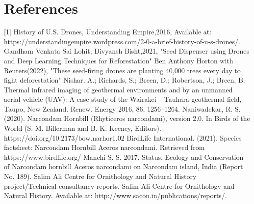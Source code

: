 \documentclass[pmlr,twocolumn,10pt]{jmlr}
\begin{document}
\section*{References}
[1] History of U.S. Drones, Understanding Empire,2016, Available at: https://understandingempire.wordpress.com/2-0-a-brief-history-of-u-s-drones/.
\newline
\newline
[2] Gandham Venkata Sai Lohit; Divyansh Bisht,2021, "Seed Dispenser using Drones and Deep Learning Techniques for Reforestation"
\newline
\newline
[3]Ben Anthony Horton  with Reuters(2022), "These seed-firing drones are planting 40,000 trees every day to fight deforestation"
\newline
\newline
[4] Nishar, A.; Richards, S.; Breen, D.; Robertson, J.; Breen, B. Thermal infrared imaging of geothermal environments and by an unmanned aerial vehicle (UAV): A case study of the Wairakei – Tauhara geothermal field, Taupo, New Zealand. Renew. Energy 2016, 86, 1256–1264.
\newline
\newline
[5] Naniwadekar, R. S. (2020). Narcondam Hornbill (Rhyticeros narcondami), version 2.0. In Birds of the World (S. M. Billerman and B. K. Keeney, Editors). 
https://doi.org/10.2173/bow.narhor1.02
\newline
\newline
[6] BirdLife International. (2021). Species factsheet: Narcondam Hornbill Aceros narcondami. Retrieved from https://www.birdlife.org/
\newline
\newline
[7] Manchi S. S. 2017. Status, Ecology and Conservation of Narcondam hornbill Aceros narcondami on Narcondam island, India (Report No. 189). Salim Ali Centre for Ornithology and Natural History project/Technical consultancy reports. Salim Ali Centre for Ornithology and Natural History. Available at: http://www.sacon.in/publications/reports/.
\newline
\newline
\end{document}

